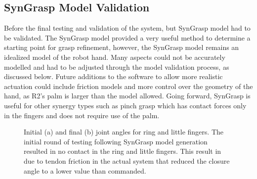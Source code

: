 \documentclass[runningheads,a4paper]{llncs}
\begin{document}
\subsection{SynGrasp Model Validation}

Before the final testing and validation of the system, but SynGrasp model had to be validated. The SynGrasp model provided a very useful method to determine a starting point for grasp refinement, however, the SynGrasp model remains an idealized model of the robot hand. Many aspects could not be accurately modelled and had to be adjusted through the model validation process, as discussed below. Future additions to the software to allow more realistic actuation could include friction models and more control over the geometry of the hand, as R2's palm is larger than the model allowed. Going forward, SynGrasp is useful for other synergy types such as pinch grasp which has contact forces only in the fingers and does not require use of the palm. 

\begin{figure}[!b]
\centering
\null\hfill
	\quad
	\hfill
	\hfill\null
  \caption{Initial (a) and final (b) joint angles for ring and little fingers. The initial round of testing following SynGrasp model generation resulted in no contact in the ring and little fingers.  This result in due to tendon friction in the actual system that reduced the closure angle to a lower value than commanded.}%
\label{pinkymodels}%
\end{figure}
\end{document}

